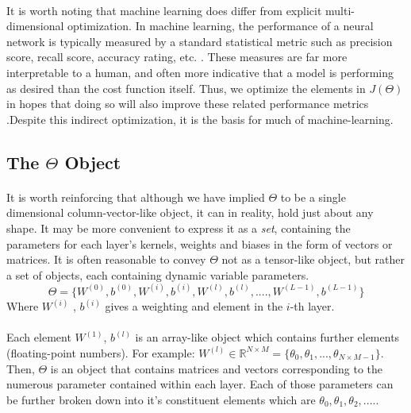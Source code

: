 \documentclass[12pt,letterpaper]{article}
\begin{document}
\paragraph*{}It is worth noting that machine learning does differ from explicit multi-dimensional optimization. In machine learning, the performance of a neural network is typically measured by a standard statistical metric such as precision score, recall score, accuracy rating, etc. \cite{Geron}. These measures are far more interpretable to a human, and often more indicative that a model is performing as desired than the cost function itself. Thus, we optimize the elements in $J(\Theta)$ in hopes that doing so will also improve these related performance metrics \cite{Goodfellow}.Despite this indirect optimization, it is the basis for much of machine-learning.

\subsection{The $\Theta$ Object}

\paragraph*{}It is worth reinforcing that although we have implied $\Theta$ to be a single dimensional column-vector-like object, it can in reality, hold just about any shape. It may be more convenient to express it as a \textit{set}, containing the parameters for each layer's kernels, weights and biases in the form of vectors or matrices. It is often reasonable to convey $\Theta$ not as a tensor-like object, but rather a set of objects, each containing dynamic variable parameters. 
\begin{equation}
\label{THETA}
\Theta = \big\{ W^{(0)} , b^{(0)} , W^{(i)} , b^{(i)}, W^{(l)} , b^{(l)}, ....,
W^{(L-1)} , b^{(L-1)} \big\} 
\end{equation}
Where $W^{(i)}$ , $b^{(i)}$ gives a weighting and element in the $i$-th layer. 

\paragraph*{}Each element  $W^{(1)}$, $b^{(l)}$ is an array-like object which contains further elements (floating-point numbers). For example: 
$W^{(l)} \in \mathbb{R}^{N \times M} = \big\{ \theta_0 , \theta_1 , ... , \theta_{N \times M - 1} \big\}$. Then, $\Theta$ is an object that contains matrices and vectors corresponding to the numerous parameter contained within each layer. Each of those parameters can be further broken down into it's constituent elements which are $\theta_0 , \theta_1 , \theta_2 , .... $. 
\end{document}
